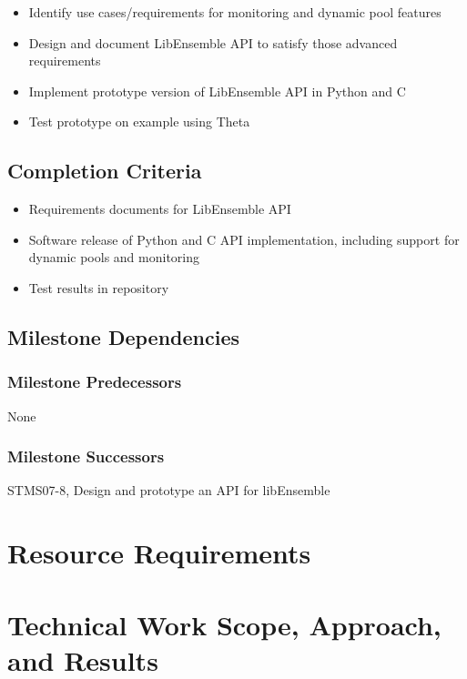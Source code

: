 \documentclass{ecpreport}
\begin{document}
\begin{itemize}
\item Identify use cases/requirements for monitoring and dynamic pool features
\item Design and document LibEnsemble API to satisfy those advanced 
requirements
\item Implement prototype version of LibEnsemble API in Python and C
\item Test prototype on example using Theta
\end{itemize}

\subsection{Completion Criteria}

\begin{itemize}
\item Requirements documents for LibEnsemble API
\item Software release of Python and C API implementation, including support 
for dynamic pools and monitoring
\item Test results in repository
\end{itemize}

\subsection{Milestone Dependencies}
\subsubsection{Milestone Predecessors}

None

\subsubsection{Milestone Successors}

STMS07-8, Design and prototype an API for libEnsemble

\section{Resource Requirements}


\section{Technical Work Scope, Approach, and Results}
\end{document}
